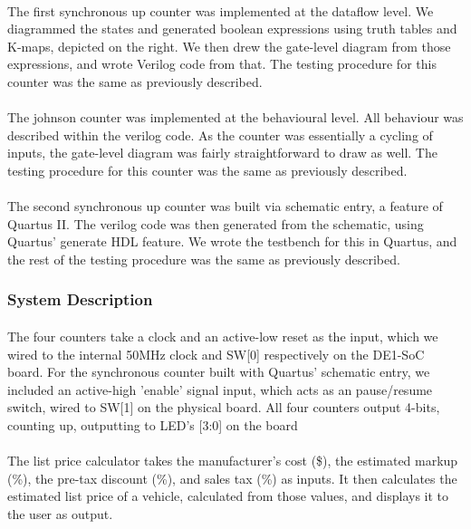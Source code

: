 \documentclass{article}
\begin{document}
		  \paragraph{}The first synchronous up counter was implemented at the dataflow level. We diagrammed the states and generated boolean expressions using truth tables and K-maps, depicted on the right. We then drew the gate-level diagram from those expressions, and wrote Verilog code from that. The testing procedure for this counter was the same as previously described.

		  \paragraph{}The johnson counter was implemented at the behavioural level. All behaviour was described within the verilog code. As the counter was essentially a cycling of inputs, the gate-level diagram was fairly straightforward to draw as well. The testing procedure for this counter was the same as previously described.

		  \paragraph{}The second synchronous up counter was built via schematic entry, a feature of Quartus II. The verilog code was then generated from the schematic, using Quartus' generate HDL feature. We wrote the testbench for this in Quartus, and the rest of the testing procedure was the same as previously described.

	  \subsubsection{System Description}
	  	\paragraph{} The four counters take a clock and an active-low reset as the input, which we wired to the internal 50MHz clock and SW[0] respectively on the DE1-SoC board. For the synchronous counter built with Quartus' schematic entry, we included an active-high 'enable' signal input, which acts as an pause/resume switch, wired to SW[1] on the physical board. All four counters output 4-bits, counting up, outputting to LED's [3:0] on the board

	  	\paragraph{} The list price calculator takes the manufacturer's cost (\$), the estimated markup (\%), the pre-tax discount (\%), and sales tax (\%) as inputs. It then calculates the estimated list price of a vehicle, calculated from those values, and displays it to the user as output.
\end{document}
